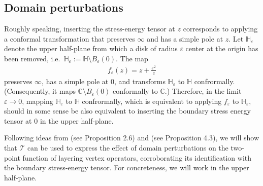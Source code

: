 \documentclass[a4paper,11pt]{article}
\begin{document}
\subsection{Domain perturbations} \label{sec:domain-perturbations}

Roughly speaking, inserting the stress-energy tensor at $z$ corresponds to applying a conformal transformation that preserves $\infty$ and has a simple pole at $z$. Let $\mathbb{H}_{\varepsilon}$ denote the upper half-plane from which a disk of radius $\varepsilon$ center at the origin has been removed, i.e.\ $\mathbb{H}_{\varepsilon} := \mathbb{H} \setminus B_{\varepsilon}(0)$. The map
\begin{align} \label{eq:conformal-map}
    f_{\varepsilon}(z) = z + \frac{\varepsilon^2}{z}
\end{align}
preserves $\infty$, has a simple pole at $0$, and transforms $\mathbb{H}_{\varepsilon}$ to $\mathbb{H}$ confrormally. (Consequently, it maps $\mathbb{C} \setminus B_{\varepsilon}(0)$ conformally to $\mathbb{C}$.) Therefore, in the limit $\varepsilon \to 0$, mapping $\mathbb{H}_{\varepsilon}$ to $\mathbb{H}$ confrormally, which is equivalent to applying $f_{\varepsilon}$ to $\mathbb{H}_{\varepsilon}$, should in some sense be also equivalent to inserting the boundary stress energy tensor at $0$ in the upper half-plane.

Following ideas from \cite{camia_2016_book} (see Proposition 2.6) and \cite{10.1214/18-EJP200} (see Proposition 4.3), we will show that $\mathcal{T}$ can be used to express the effect of domain perturbations on the two-point function of layering vertex operators, corroborating its identification with the boundary stress-energy tensor. For concreteness, we will work in the upper half-plane.
\end{document}
